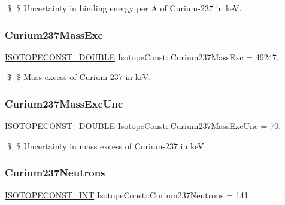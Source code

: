 \$ \$ Uncertainty in binding energy per A of Curium-\/237 in keV. \mbox{\label{group___isotope_const-_curium-_cm237_ga6c37cec253e800b751fc6c20621ef4b9}} 
\subsubsection{\texorpdfstring{Curium237\+Mass\+Exc}{Curium237MassExc}}
{\footnotesize\ttfamily \mbox{\hyperlink{group___isotope_const-_macros_ga8f45a7272ce02c0b4c65c44636ed719a}{I\+S\+O\+T\+O\+P\+E\+C\+O\+N\+S\+T\+\_\+\+D\+O\+U\+B\+LE}} Isotope\+Const\+::\+Curium237\+Mass\+Exc = 49247.}

\$ \$ Mass excess of Curium-\/237 in keV. \mbox{\label{group___isotope_const-_curium-_cm237_ga11682f36668aaeb27b71b1ffaf8716a9}} 
\subsubsection{\texorpdfstring{Curium237\+Mass\+Exc\+Unc}{Curium237MassExcUnc}}
{\footnotesize\ttfamily \mbox{\hyperlink{group___isotope_const-_macros_ga8f45a7272ce02c0b4c65c44636ed719a}{I\+S\+O\+T\+O\+P\+E\+C\+O\+N\+S\+T\+\_\+\+D\+O\+U\+B\+LE}} Isotope\+Const\+::\+Curium237\+Mass\+Exc\+Unc = 70.}

\$ \$ Uncertainty in mass excess of Curium-\/237 in keV. \mbox{\label{group___isotope_const-_curium-_cm237_ga34d6e32b89b5e62aebd9af86073b0010}} 
\subsubsection{\texorpdfstring{Curium237\+Neutrons}{Curium237Neutrons}}
{\footnotesize\ttfamily \mbox{\hyperlink{group___isotope_const-_macros_ga5f18360b3e99483a35c32d789e62621c}{I\+S\+O\+T\+O\+P\+E\+C\+O\+N\+S\+T\+\_\+\+I\+NT}} Isotope\+Const\+::\+Curium237\+Neutrons = 141}

